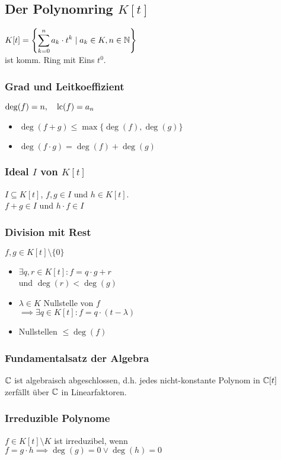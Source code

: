 \subsection*{Der Polynomring $K[t]$}
$\displaystyle K[t] = \left\{\sum_{k=0}^n a_k\cdot t^k \mid a_k \in K, n\in\mathbb{N} \right\}$ \\
ist komm. Ring mit Eins $t^0$.

\subsubsection*{Grad und Leitkoeffizient}
$\deg(f)=n, \quad \operatorname{lc}(f)=a_n$
\begin{itemize}
	\item $\deg(f+g) \le \max\{\deg(f),\deg(g)\}$
	\item $\deg(f\cdot g) = \deg(f)+\deg(g)$
\end{itemize}

\subsubsection*{Ideal $I$ von $K[t]$}
$I\subseteq K[t]$, $f,g\in I$ und $h\in K[t]$. \\
$f+g \in I$ und $h \cdot f \in I$

\subsubsection*{Division mit Rest}
$f,g \in K[t]\setminus\{0\}$
\begin{itemize}
	\item $\exists q,r \in K[t]: f=q\cdot g + r$ \\
		und $\deg(r) < \deg(g)$
	\item $\lambda\in K$ Nullstelle von $f$\\
		$\implies\exists q\in K[t]: f=q\cdot(t-\lambda)$
	\item Nullstellen $\le \deg(f)$
\end{itemize}

\subsubsection*{Fundamentalsatz der Algebra}
$\mathbb{C}$ ist algebraisch abgeschlossen, d.h.
jedes nicht-konstante Polynom in $\mathbb{C}[t]$ zerfällt über $\mathbb{C}$ in Linearfaktoren.

\subsubsection*{Irreduzible Polynome}
$f\in K[t]\setminus K$ ist irreduzibel, wenn \\
$f=g\cdot h \implies \deg(g)=0 \lor \deg(h)=0$
